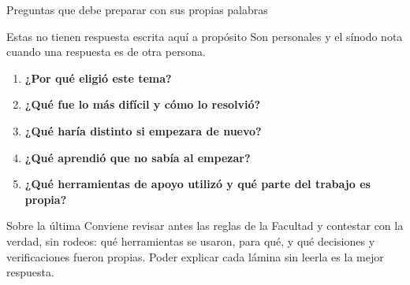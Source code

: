 \documentclass[aspectratio=169,10pt]{beamer}
\begin{document}
\begin{frame}{Preguntas que debe preparar con sus propias palabras}
  \begin{alertblock}{Estas no tienen respuesta escrita aquí a propósito}
    Son personales y el sínodo nota cuando una respuesta es de otra persona.
  \end{alertblock}
  \vspace{0.4em}
  \begin{enumerate}
    \item \textbf{¿Por qué eligió este tema?}
    \item \textbf{¿Qué fue lo más difícil y cómo lo resolvió?}
    \item \textbf{¿Qué haría distinto si empezara de nuevo?}
    \item \textbf{¿Qué aprendió que no sabía al empezar?}
    \item \textbf{¿Qué herramientas de apoyo utilizó y qué parte del trabajo es propia?}
  \end{enumerate}
  \vspace{0.4em}
  \begin{block}{Sobre la última}
    \footnotesize Conviene revisar antes las reglas de la Facultad y contestar con la verdad, sin rodeos: qué herramientas se usaron, para qué, y qué decisiones y verificaciones fueron propias. Poder explicar cada lámina sin leerla es la mejor respuesta.
  \end{block}
\end{frame}
\end{document}
